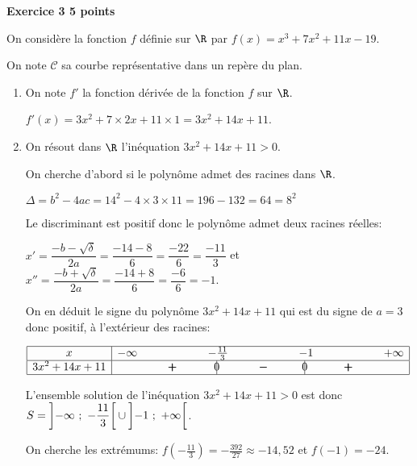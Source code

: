 \textbf{\large Exercice 3 \hfill 5 points}

\bigskip

On considère la fonction $f$ définie sur $\R$ par $f(x)=x^3 + 7x^2 +11x - 19$.

On note $\mathcal{C}$ sa courbe représentative dans un repère \Oij{} du plan.

\begin{enumerate}
\item On note $f'$ la fonction dérivée de la fonction $f$ sur $\R$. %

$f'(x) = 3x^2 +7\times 2x +11\times 1 = 3x^2+14x+11$.

\item On résout dans $\R$ l'inéquation $3x^2+14x+11 > 0$.

On cherche d'abord si le polynôme admet des racines dans $\R$.

$\Delta = b^2-4ac = 14^2 - 4\times 3 \times 11 = 196-132=64=8^2$

Le discriminant est positif donc le polynôme admet deux racines réelles:

$x'=\dfrac{-b-\sqrt{\delta}}{2a} = \dfrac{-14-8}{6} = \dfrac{-22}{6}=\dfrac{-11}{3}$
et
$x''=\dfrac{-b+\sqrt{\delta}}{2a} = \dfrac{-14+8}{6} = \dfrac{-6}{6}=-1$.

On en déduit le signe du polynôme $3x^2+14x+11$ qui est du signe de $a=3$ donc positif, à l'extérieur des racines:

\begin{center}
{
\renewcommand{\arraystretch}{1.5}
\def\esp{\hspace*{1.5cm}}
$\begin{array}{|c | *{7}{c} |} 
\hline
x  & -\infty & \esp & -\frac{11}{3} & \esp & -1 & \esp & +\infty \\
\hline
3x^2+14x+11 &  & \pmb{+} &  \vline\hspace{-2.7pt}{0} & \pmb{-} & \vline\hspace{-2.7pt}{0} & \pmb{+} &\\
\hline
\end{array}$
}
\end{center}

L'ensemble solution de l'inéquation $3x^2+14x+11 > 0$ est donc $S=\left ]-\infty~;~-\dfrac{11}{3} \right [ \cup \left ] -1~;~+\infty\vphantom{\dfrac{11}{3}} \right [$.

On cherche les extrémums:
$f\left ( -\frac{11}{3}\right )=-\frac{392}{27}\approx -14,52$ et $f(-1) = -24$.


\end{enumerate}

